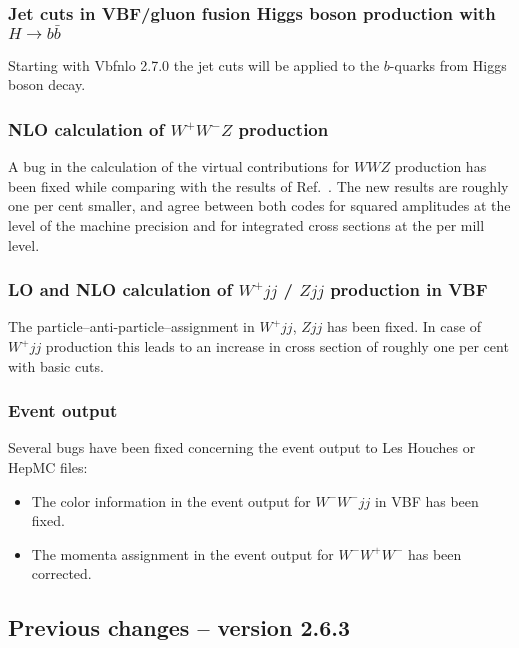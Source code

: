 \documentclass[english,12pt]{article}
\begin{document}
          
\subsubsection{Jet cuts in VBF/gluon fusion Higgs boson production with $H\to b\bar{b}$}

Starting with {\sc Vbfnlo 2.7.0} the jet cuts will be applied to the
$b$-quarks from Higgs boson decay.


\subsubsection{NLO calculation of $W^+W^-Z$ production}

A bug in the calculation of the virtual contributions for $WWZ$
production has been fixed while comparing with the results of
Ref.~\cite{Nhung:2013jta}.  The new results are roughly one per cent
smaller, and agree between both codes for squared amplitudes at the
level of the machine precision and for integrated cross sections at the
per mill level.


\subsubsection{LO and NLO calculation of $W^+jj$ / $Zjj$ production in VBF}

The particle--anti-particle--assignment in $W^+jj$, $Zjj$ has been fixed.
In case of $W^+jj$ production this leads to an increase in cross section of roughly one per cent with basic cuts.


\subsubsection{Event output}

Several bugs have been fixed concerning the event output to Les Houches or HepMC files:
\begin{itemize}
 \item The color information in the event output for $W^-W^- jj$ in VBF has been fixed.
 \item The momenta assignment in the event output for $W^-W^+W^-$ has been corrected.
\end{itemize}



\subsection{Previous changes -- version 2.6.3}
\end{document}
